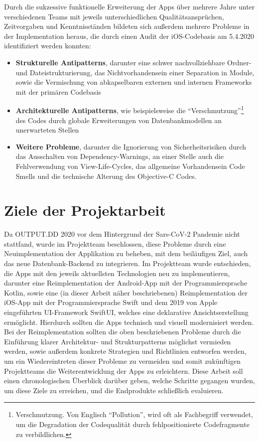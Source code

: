 Durch die sukzessive funktionelle Erweiterung der Apps über mehrere Jahre unter verschiedenen Teams mit jeweils unterschiedlichen Qualitätsansprüchen, Zeitvorgaben und Kenntnisständen bildeten sich außerdem mehrere Probleme in der Implementation heraus, die durch einen Audit der iOS-Codebasis am 5.4.2020 identifiziert werden konnten:

\begin{itemize}
  \item \textbf{Strukturelle Antipatterns}, darunter eine schwer nachvollziehbare Ordner- und Dateistrukturierung, das Nichtvorhandensein einer Separation in Module, sowie die Vermischung von abkapselbaren externen und internen Frameworks mit der primären Codebasis
  \item \textbf{Architekturelle Antipatterns}, wie beispielsweise die \enquote{Verschmutzung}\footnote{Verschmutzung. Von Englisch \enquote{Pollution}, wird oft als Fachbegriff verwendet, um die Degradation der Codequalität durch fehlpositionierte Codefragmente zu verbildlichen.} des Codes durch globale Erweiterungen von Datenbankmodellen an unerwarteten Stellen
  \item \textbf{Weitere Probleme}, darunter die Ignorierung von Sicherheitsrisiken durch das Ausschalten von Dependency-Warnings, an einer Stelle auch die Fehlverwendung von View-Life-Cycles, das allgemeine Vorhandensein Code Smells und die technische Alterung des Objective-C Codes.
\end{itemize}

\section{Ziele der Projektarbeit}

Da OUTPUT.DD 2020 vor dem Hintergrund der Sars-CoV-2 Pandemie nicht stattfand, wurde im Projektteam beschlossen, diese Probleme durch eine Neuimplementation der Applikation zu beheben, mit dem beiläufigen Ziel, auch das neue Datenbank-Backend zu integrieren. Im Projektteam wurde entschieden, die Apps mit den jeweils aktuellsten Technologien neu zu implementieren, darunter eine Reimplementation der Android-App mit der Programmiersprache Kotlin, sowie eine (in dieser Arbeit näher beschriebenen) Reimplementation der iOS-App mit der Programmiersprache Swift und dem 2019 von Apple eingeführten UI-Framework SwiftUI, welches eine deklarative Ansichtserstellung ermöglicht. Hierdurch sollten die Apps technisch und visuell modernisiert werden. Bei der Reimplementation sollten die oben beschriebenen Probleme durch die Einführung klarer Architektur- und Strukturpatterns möglichst vermieden werden, sowie außerdem konkrete Strategien und Richtlinien entworfen werden, um ein Wiedereintreten dieser Probleme zu vermeiden und somit zukünftigen Projektteams die Weiterentwicklung der Apps zu erleichtern. Diese Arbeit soll einen chronologischen Überblick darüber geben, welche Schritte gegangen wurden, um diese Ziele zu erreichen, und die Endprodukte schließlich evaluieren.
